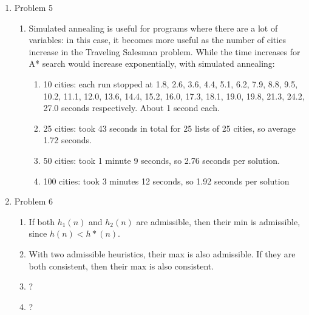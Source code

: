 \documentclass[11pt]{article}
\begin{document}
\begin{enumerate}
\item Problem 5
\begin{enumerate}
\item Simulated annealing is useful for programs where there are a lot of variables: in this case, it becomes more useful as the number of cities increase in the Traveling Salesman problem. While the time increases for A* search would increase exponentially, with simulated annealing:
\begin{enumerate}
\item 10 cities: each run stopped at 1.8, 2.6, 3.6, 4.4, 5.1, 6.2, 7.9, 8.8, 9.5, 10.2, 11.1, 12.0, 13.6, 14.4, 15.2, 16.0, 17.3, 18.1, 19.0, 19.8, 21.3, 24.2, 27.0 seconds respectively. About 1 second each.
\item 25 cities: took 43 seconds in total for 25 lists of 25 cities, so average 1.72 seconds.
\item 50 cities: took 1 minute 9 seconds, so 2.76 seconds per solution.
\item 100 cities: took 3 minutes 12 seconds, so 1.92 seconds per solution
\end{enumerate}
\end{enumerate}

\item Problem 6
\begin{enumerate}
\item If both $h_{1}(n)$ and $h_2(n)$ are admissible, then their min is admissible, since $h(n) < h*(n)$.
\item With two admissible heuristics, their max is also admissible. If they are both consistent, then their max is also consistent.
\item ?
\item ?
\end{enumerate}


\end{enumerate}
\end{document}
